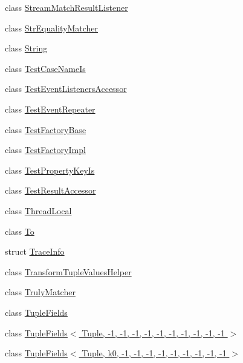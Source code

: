 \begin{DoxyCompactItemize}
\item 
class \hyperlink{classtesting_1_1internal_1_1_stream_match_result_listener}{Stream\+Match\+Result\+Listener}
\item 
class \hyperlink{classtesting_1_1internal_1_1_str_equality_matcher}{Str\+Equality\+Matcher}
\item 
class \hyperlink{classtesting_1_1internal_1_1_string}{String}
\item 
class \hyperlink{classtesting_1_1internal_1_1_test_case_name_is}{Test\+Case\+Name\+Is}
\item 
class \hyperlink{classtesting_1_1internal_1_1_test_event_listeners_accessor}{Test\+Event\+Listeners\+Accessor}
\item 
class \hyperlink{classtesting_1_1internal_1_1_test_event_repeater}{Test\+Event\+Repeater}
\item 
class \hyperlink{classtesting_1_1internal_1_1_test_factory_base}{Test\+Factory\+Base}
\item 
class \hyperlink{classtesting_1_1internal_1_1_test_factory_impl}{Test\+Factory\+Impl}
\item 
class \hyperlink{classtesting_1_1internal_1_1_test_property_key_is}{Test\+Property\+Key\+Is}
\item 
class \hyperlink{classtesting_1_1internal_1_1_test_result_accessor}{Test\+Result\+Accessor}
\item 
class \hyperlink{classtesting_1_1internal_1_1_thread_local}{Thread\+Local}
\item 
class \hyperlink{classtesting_1_1internal_1_1_to}{To}
\item 
struct \hyperlink{structtesting_1_1internal_1_1_trace_info}{Trace\+Info}
\item 
class \hyperlink{classtesting_1_1internal_1_1_transform_tuple_values_helper}{Transform\+Tuple\+Values\+Helper}
\item 
class \hyperlink{classtesting_1_1internal_1_1_truly_matcher}{Truly\+Matcher}
\item 
class \hyperlink{classtesting_1_1internal_1_1_tuple_fields}{Tuple\+Fields}
\item 
class \hyperlink{classtesting_1_1internal_1_1_tuple_fields_3_01_tuple_00_01-1_00_01-1_00_01-1_00_01-1_00_01-1_00_c541d4fe72f9dece2f1a50ee33bb16df}{Tuple\+Fields$<$ Tuple, -\/1, -\/1, -\/1, -\/1, -\/1, -\/1, -\/1, -\/1, -\/1, -\/1 $>$}
\item 
class \hyperlink{classtesting_1_1internal_1_1_tuple_fields_3_01_tuple_00_01k0_00_01-1_00_01-1_00_01-1_00_01-1_00_079b3e59a7bb10f5d0d7a5843be2be9d}{Tuple\+Fields$<$ Tuple, k0, -\/1, -\/1, -\/1, -\/1, -\/1, -\/1, -\/1, -\/1, -\/1 $>$}

\end{DoxyCompactItemize}
